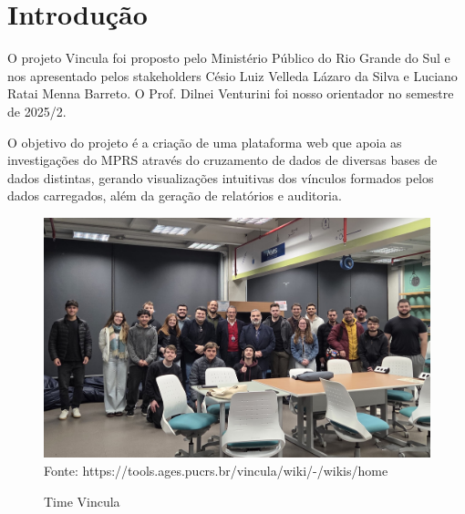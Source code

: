 \section[Introdução]{Introdução} %

O projeto Vincula foi proposto pelo Ministério Público do Rio Grande do Sul e nos apresentado pelos stakeholders Césio Luiz Velleda Lázaro da Silva e Luciano Ratai Menna Barreto. O Prof. Dilnei Venturini foi nosso orientador no semestre de 2025/2.

O objetivo do projeto é a criação de uma plataforma web que apoia as investigações do MPRS através do cruzamento de dados de diversas bases de dados distintas, gerando visualizações intuitivas dos vínculos formados pelos dados carregados, além da geração de relatórios e auditoria.

\begin{figure}[H]
    \centering
    \small
    \caption{Time Vincula}
    \includegraphics[width=1\linewidth]{conteudo//2 - ages I//conteudo//figures//foto-time.jpg}
    Fonte: https://tools.ages.pucrs.br/vincula/wiki/-/wikis/home
\end{figure}